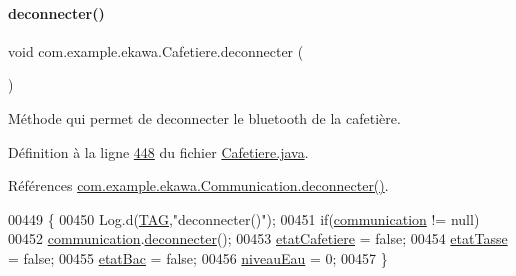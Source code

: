 \mbox{\label{classcom_1_1example_1_1ekawa_1_1_cafetiere_a8bf7e4352dafd60485555ee68edb9e52}} 
\paragraph{\texorpdfstring{deconnecter()}{deconnecter()}}
{\footnotesize\ttfamily void com.\+example.\+ekawa.\+Cafetiere.\+deconnecter (\begin{DoxyParamCaption}{ }\end{DoxyParamCaption})}



Méthode qui permet de deconnecter le bluetooth de la cafetière. 



Définition à la ligne \hyperlink{_cafetiere_8java_source_l00448}{448} du fichier \hyperlink{_cafetiere_8java_source}{Cafetiere.\+java}.



Références \hyperlink{_communication_8java_source_l00250}{com.\+example.\+ekawa.\+Communication.\+deconnecter()}.


\begin{DoxyCode}
00449     \{
00450         Log.d(\hyperlink{classcom_1_1example_1_1ekawa_1_1_cafetiere_aa0c1fd99a2508b06c462aea17034aa91}{TAG},\textcolor{stringliteral}{"deconnecter()"});
00451         \textcolor{keywordflow}{if}(\hyperlink{classcom_1_1example_1_1ekawa_1_1_cafetiere_af9506a7805d000d2cb83444cdb8ea889}{communication} != null)
00452             \hyperlink{classcom_1_1example_1_1ekawa_1_1_cafetiere_af9506a7805d000d2cb83444cdb8ea889}{communication}.\hyperlink{classcom_1_1example_1_1ekawa_1_1_communication_a024ca42abcc8727d303a54ec44b4c99b}{deconnecter}();
00453         \hyperlink{classcom_1_1example_1_1ekawa_1_1_cafetiere_ae170dd018d1e740b3bda080d1cc3d900}{etatCafetiere} = \textcolor{keyword}{false};
00454         \hyperlink{classcom_1_1example_1_1ekawa_1_1_cafetiere_a93c5021591facf06397e760c11556904}{etatTasse} = \textcolor{keyword}{false};
00455         \hyperlink{classcom_1_1example_1_1ekawa_1_1_cafetiere_a058f7a18cd9c0567d583b8bc6250d143}{etatBac} = \textcolor{keyword}{false};
00456         \hyperlink{classcom_1_1example_1_1ekawa_1_1_cafetiere_aaf8e1a960f803c2de4defa414b5984a4}{niveauEau} = 0;
00457     \}
\end{DoxyCode}
\mbox{\label{classcom_1_1example_1_1ekawa_1_1_cafetiere_a2657310905f93ef4fba5b5f1dad81be9}} 
